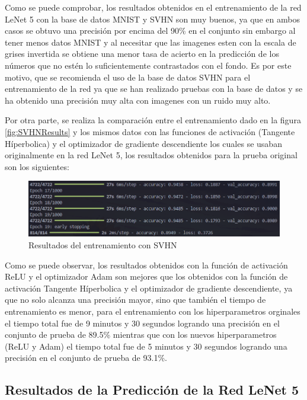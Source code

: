 Como se puede comprobar, los resultados obtenidos en el entrenamiento de la red LeNet 5 con la base de datos
MNIST y SVHN son muy buenos, ya que en ambos casos se obtuvo una precisión por encima del 90\% en el conjunto
sin embargo al tener menos datos MNIST y al necesitar que las imagenes esten con la escala de grises invertida
se obtiene una menor tasa de acierto en la predicción de los números que no estén lo suficientemente contrastados
con el fondo. Es por este motivo, que se recomienda el uso de la base de datos SVHN para el entrenamiento de la red
ya que se han realizado pruebas con la base de datos y se ha obtenido una precisión muy alta con imagenes con un 
ruido muy alto.

Por otra parte, se realiza la comparación entre el entrenamiento dado en la figura \ref{fig:SVHNResults} y
los mismos datos con las funciones de activación (Tangente Híperbolica) y el optimizador de gradiente descendiente los
cuales se usaban originalmente en la red LeNet 5, los resultados obtenidos para la prueba original son los siguientes:

\begin{figure}[htbp]
    \centering
    \includegraphics[width=\linewidth]{src/figures/original_info_training.png}
    \caption{Resultados del entrenamiento con SVHN}
    \label{fig:SVHNResultsOriginal}
\end{figure}

Como se puede observar, los resultados obtenidos con la función de activación ReLU y el optimizador Adam son
mejores que los obtenidos con la función de activación Tangente Híperbolica y el optimizador de gradiente descendiente,
ya que no solo alcanza una precisión mayor, sino que también el tiempo de entrenamiento es menor, para el entrenamiento
con los hiperparametros orginales el tiempo total fue de 9 minutos y 30 segundos logrando una precisión en el conjunto de
prueba de 89.5\% mientras que con los nuevos hiperparametros (ReLU y Adam) el tiempo total fue de 5 minutos y 30 segundos 
logrando una precisión en el conjunto de prueba de 93.1\%.

\subsection{Resultados de la Predicción de la Red LeNet 5}

